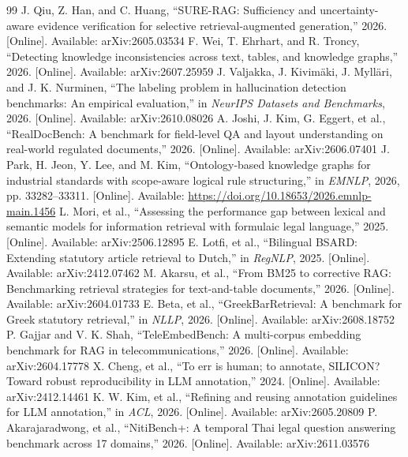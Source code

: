 \documentclass[conference]{IEEEtran}
\begin{document}
\begin{thebibliography}{99}
 J. Qiu, Z. Han, and C. Huang, ``SURE-RAG: Sufficiency and uncertainty-aware evidence verification for selective retrieval-augmented generation,'' 2026. [Online]. Available: arXiv:2605.03534
 F. Wei, T. Ehrhart, and R. Troncy, ``Detecting knowledge inconsistencies across text, tables, and knowledge graphs,'' 2026. [Online]. Available: arXiv:2607.25959
 J. Valjakka, J. Kivim\"aki, J. Myll\"ari, and J. K. Nurminen, ``The labeling problem in hallucination detection benchmarks: An empirical evaluation,'' in \emph{NeurIPS Datasets and Benchmarks}, 2026. [Online]. Available: arXiv:2610.08026
 A. Joshi, J. Kim, G. Eggert, et al., ``RealDocBench: A benchmark for field-level QA and layout understanding on real-world regulated documents,'' 2026. [Online]. Available: arXiv:2606.07401
 J. Park, H. Jeon, Y. Lee, and M. Kim, ``Ontology-based knowledge graphs for industrial standards with scope-aware logical rule structuring,'' in \emph{EMNLP}, 2026, pp. 33282--33311. [Online]. Available: \url{https://doi.org/10.18653/2026.emnlp-main.1456}
 L. Mori, et al., ``Assessing the performance gap between lexical and semantic models for information retrieval with formulaic legal language,'' 2025. [Online]. Available: arXiv:2506.12895
 E. Lotfi, et al., ``Bilingual BSARD: Extending statutory article retrieval to Dutch,'' in \emph{RegNLP}, 2025. [Online]. Available: arXiv:2412.07462
 M. Akarsu, et al., ``From BM25 to corrective RAG: Benchmarking retrieval strategies for text-and-table documents,'' 2026. [Online]. Available: arXiv:2604.01733
 E. Beta, et al., ``GreekBarRetrieval: A benchmark for Greek statutory retrieval,'' in \emph{NLLP}, 2026. [Online]. Available: arXiv:2608.18752
 P. Gajjar and V. K. Shah, ``TeleEmbedBench: A multi-corpus embedding benchmark for RAG in telecommunications,'' 2026. [Online]. Available: arXiv:2604.17778
 X. Cheng, et al., ``To err is human; to annotate, SILICON? Toward robust reproducibility in LLM annotation,'' 2024. [Online]. Available: arXiv:2412.14461
 K. W. Kim, et al., ``Refining and reusing annotation guidelines for LLM annotation,'' in \emph{ACL}, 2026. [Online]. Available: arXiv:2605.20809
 P. Akarajaradwong, et al., ``NitiBench+: A temporal Thai legal question answering benchmark across 17 domains,'' 2026. [Online]. Available: arXiv:2611.03576

\end{thebibliography}
\end{document}
